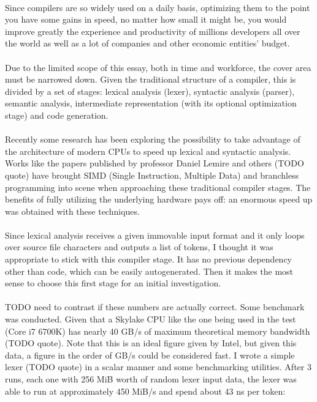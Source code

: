 \documentclass[12pt]{article}
\begin{document}
	\paragraph{}
	Since compilers are so widely used on a daily basis, optimizing them to the point you have some gains in speed, no matter how small it might be, you would improve greatly the experience and productivity of millions developers all over the world as well as a lot of companies and other economic entities' budget.
	\paragraph{}
	Due to the limited scope of this essay, both in time and workforce, the cover area must be narrowed down. Given the traditional structure of a compiler, this is divided by a set of stages: lexical analysis (lexer), syntactic analysis (parser), semantic analysis, intermediate representation (with its optional optimization stage) and code generation.
	\paragraph{}
	Recently some research has been exploring the possibility to take advantage of the architecture of modern CPUs to speed up lexical and syntactic analysis. Works like the papers published by professor Daniel Lemire and others (TODO quote) have brought SIMD (Single Instruction, Multiple Data) and branchless programming into scene when approaching these traditional compiler stages. The benefits of fully utilizing the underlying hardware pays off: an enormous speed up was obtained with these techniques.
	\paragraph{}
	Since lexical analysis receives a given immovable input format and it only loops over source file characters and outputs a list of tokens, I thought it was appropriate to stick with this compiler stage. It has no previous dependency other than code, which can be easily autogenerated. Then it makes the most sense to choose this first stage for an initial investigation.
	
	\paragraph{}
	TODO need to contrast if these numbers are actually correct.
	Some benchmark was conducted. Given that a Skylake CPU like the one being used in the test (Core i7 6700K) has nearly 40 GB/s of maximum theoretical memory bandwidth (TODO quote). Note that this is an ideal figure given by Intel, but given this data, a figure in the order of GB/s could be considered fast. I wrote a simple lexer (TODO quote) in a scalar manner and some benchmarking utilities. After 3 runs, each one with 256 MiB worth of random lexer input data, the lexer was able to run at approximately 450 MiB/s and spend about 43 ns per token:
	
\end{document}

